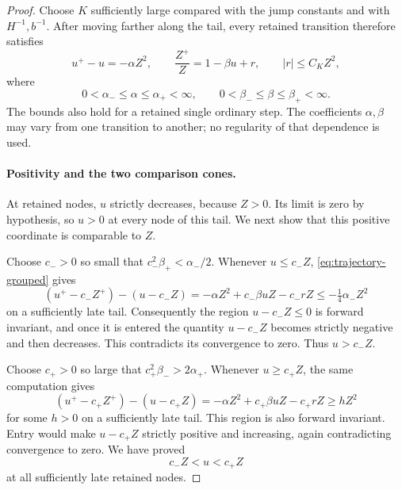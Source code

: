 \begin{proof}
Choose $K$ sufficiently large compared with the jump constants and
with $H^{-1},b^{-1}$.  After moving farther along the tail, every
retained transition therefore satisfies
\begin{equation}
 u^+-u=-\alpha Z^2,\qquad
 \frac{Z^+}{Z}=1-\beta u+r,
 \qquad |r|\le C_K Z^2,
 \label{eq:trajectory-grouped}
\end{equation}
where
\begin{equation}
 0<\alpha_-\le\alpha\le\alpha_+<\infty,
 \qquad
 0<\beta_-\le\beta\le\beta_+<\infty.
 \label{eq:trajectory-grouped-bounds}
\end{equation}
The bounds also hold for a retained single ordinary step.  The
coefficients $\alpha,\beta$ may vary from one transition to another;
no regularity of that dependence is used.

\paragraph{Positivity and the two comparison cones.}
At retained nodes, $u$ strictly decreases, because $Z>0$.  Its limit
is zero by hypothesis, so $u>0$ at every node of this tail.  We next
show that this positive coordinate is comparable to $Z$.

Choose $c_->0$ so small that $c_-^2\beta_+<\alpha_-/2$.
Whenever $u\le c_-Z$, \eqref{eq:trajectory-grouped} gives
\[
 (u^+-c_-Z^+)-(u-c_-Z)
   =-\alpha Z^2+c_-\beta uZ-c_-rZ
   \le -\tfrac14\alpha_-Z^2
\]
on a sufficiently late tail.  Consequently the region
$u-c_-Z\le0$ is forward invariant, and once it is entered the
quantity $u-c_-Z$ becomes strictly negative and then decreases.
This contradicts its convergence to zero.  Thus $u>c_-Z$.

Choose $c_+>0$ so large that
$c_+^2\beta_->2\alpha_+$.  Whenever $u\ge c_+Z$, the same computation
gives
\[
 (u^+-c_+Z^+)-(u-c_+Z)
   =-\alpha Z^2+c_+\beta uZ-c_+rZ
   \ge hZ^2
\]
for some $h>0$ on a sufficiently late tail.  This region is also
forward invariant.  Entry would make $u-c_+Z$ strictly positive and
increasing, again contradicting convergence to zero.  We have proved
\begin{equation}
 c_-Z<u<c_+Z
 \label{eq:trajectory-cones}
\end{equation}
at all sufficiently late retained nodes.


\end{proof}
